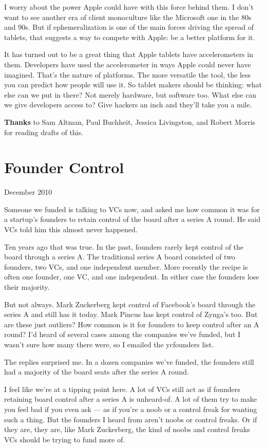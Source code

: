 \documentclass[12pt]{book}
\begin{document}
I worry about the power Apple could have with this force behind them. I
don't want to see another era of client monoculture like the Microsoft
one in the 80s and 90s. But if ephemeralization is one of the main
forces driving the spread of tablets, that suggests a way to compete
with Apple: be a better platform for it.

It has turned out to be a great thing that Apple tablets have
accelerometers in them. Developers have used the accelerometer in ways
Apple could never have imagined. That's the nature of platforms. The
more versatile the tool, the less you can predict how people will use
it. So tablet makers should be thinking: what else can we put in there?
Not merely hardware, but software too. What else can we give developers
access to? Give hackers an inch and they'll take you a mile.

\textbf{Thanks} to Sam Altman, Paul Buchheit, Jessica Livingston, and
Robert Morris for reading drafts of this.
\chapter{Founder Control}

December 2010

Someone we funded is talking to VCs now, and asked me how common it was
for a startup's founders to retain control of the board after a series A
round. He said VCs told him this almost never happened.

Ten years ago that was true. In the past, founders rarely kept control
of the board through a series A. The traditional series A board
consisted of two founders, two VCs, and one independent member. More
recently the recipe is often one founder, one VC, and one independent.
In either case the founders lose their majority.

But not always. Mark Zuckerberg kept control of Facebook's board through
the series A and still has it today. Mark Pincus has kept control of
Zynga's too. But are these just outliers? How common is it for founders
to keep control after an A round? I'd heard of several cases among the
companies we've funded, but I wasn't sure how many there were, so I
emailed the ycfounders list.

The replies surprised me. In a dozen companies we've funded, the
founders still had a majority of the board seats after the series A
round.

I feel like we're at a tipping point here. A lot of VCs still act as if
founders retaining board control after a series A is unheard-of. A lot
of them try to make you feel bad if you even ask --- as if you're a noob
or a control freak for wanting such a thing. But the founders I heard
from aren't noobs or control freaks. Or if they are, they are, like Mark
Zuckerberg, the kind of noobs and control freaks VCs should be trying to
fund more of.
\end{document}
